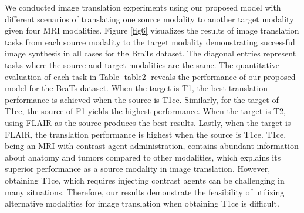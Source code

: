 \documentclass[10pt,twocolumn,letterpaper]{article}
\begin{document}
We conducted image translation experiments using our proposed model with different scenarios of translating one source modality to another target modality given four MRI modalities. Figure \ref{fig6} visualizes the results of image translation tasks from each source modality to the target modality demonstrating successful image synthesis in all cases for the BraTs dataset. The diagonal entries represent tasks where the source and target modalities are the same. The quantitative evaluation of each task in Table \ref{table2} reveals the performance of our proposed model for the BraTs dataset. When the target is T1, the best translation performance is achieved when the source is T1ce. Similarly, for the target of T1ce, the source of F1 yields the highest performance. When the target is T2, using FLAIR as the source produces the best results. Lastly, when the target is FLAIR, the translation performance is highest when the source is T1ce. T1ce, being an MRI with contrast agent administration, contains abundant information about anatomy and tumors compared to other modalities, which explains its superior performance as a source modality in image translation. However, obtaining T1ce, which requires injecting contrast agents can be challenging in many situations. Therefore, our results demonstrate the feasibility of utilizing alternative modalities for image translation when obtaining T1ce is difficult.
\end{document}

